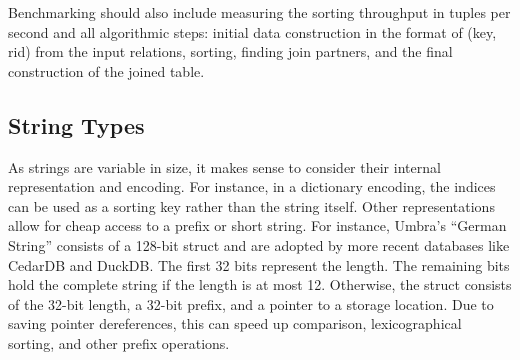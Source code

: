 Benchmarking should also include measuring the sorting throughput in tuples per second and all 
algorithmic steps: initial data construction in the format of (key, rid) from the input relations,
sorting, finding join partners, and the final construction of the joined table. 

\subsection{String Types}

As strings are variable in size, it makes sense to consider their internal representation and
encoding. For instance, in a dictionary encoding, the indices can be used as a sorting key rather
than the string itself. Other representations allow for cheap access to a prefix or short string.
For instance, Umbra's ``German String'' \cite{DBLP:conf/cidr/NeumannF20} consists of a 128-bit 
struct and are adopted by more recent
databases like CedarDB and DuckDB. The first 32 bits represent the length. The remaining bits hold
the complete string if the length is at most 12. Otherwise, the struct consists of the 32-bit
length, a 32-bit prefix, and a pointer to a storage location. Due to saving pointer dereferences,
this can speed up comparison, lexicographical sorting, and other prefix operations.



